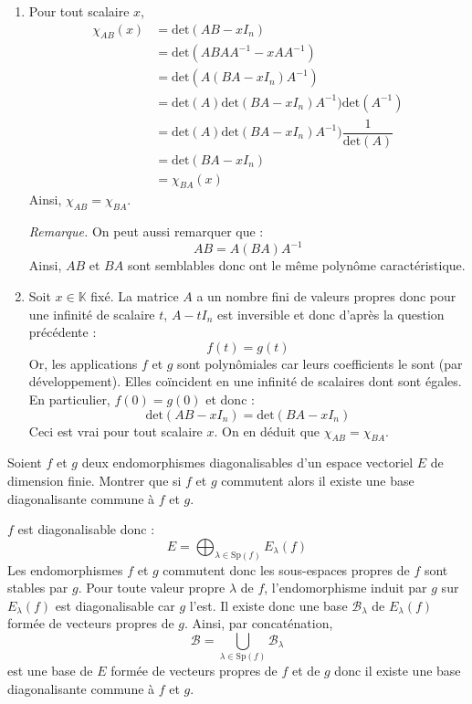 \documentclass[a4paper,10pt]{report}
\begin{document}
\begin{enumerate}
\item Pour tout scalaire $x$,
\begin{align*}
\chi_{AB}(x) & = \textrm{det}(AB-xI_n) \\
& = \textrm{det}(ABAA^{-1}-xA A^{-1}) \\
& = \textrm{det}(A(BA-xI_n) A^{-1}) \\
& = \textrm{det}(A)\textrm{det}(BA-xI_n) A^{-1})\textrm{det}(A^{-1}) \\
& = \textrm{det}(A)\textrm{det}(BA-xI_n) A^{-1}) \dfrac{1}{\textrm{det}(A)} \\
& = \textrm{det}(BA-xI_n) \\
& = \chi_{BA}(x)
\end{align*}
Ainsi, $\chi_{AB}= \chi_{BA}$.

\medskip

\noindent \textit{Remarque.} On peut aussi remarquer que :
$$ AB=  A(BA)A^{-1}$$
Ainsi, $AB$ et $BA$ sont semblables donc ont le même polynôme caractéristique.
\item Soit $x \in \mathbb{K}$ fixé. La matrice $A$ a un nombre fini de valeurs propres donc pour une infinité de scalaire $t$, $A-t I_n$ est inversible et donc d'après la question précédente :
$$ f(t)=g(t)$$
Or, les applications $f$ et $g$ sont polynômiales car leurs coefficients le sont (par développement). Elles coïncident en une infinité de scalaires dont sont égales. En particulier, $f(0)=g(0)$ et donc :
$$ \textrm{det}(AB-xI_n)= \textrm{det}(BA-xI_n)$$
Ceci est vrai pour tout scalaire $x$. On en déduit que $\chi_{AB}= \chi_{BA}$.
\end{enumerate}

\begin{Exercice}{}  Soient $f$ et $g$ deux endomorphismes diagonalisables d'un espace vectoriel $E$ de dimension finie. Montrer que si $f$ et $g$ commutent alors il existe une base diagonalisante commune à $f$ et $g$.
\end{Exercice}

\corr $f$ est diagonalisable donc :
$$ E = \bigoplus_{\lambda \in \textrm{Sp}(f)} E_{\lambda}(f)$$
Les endomorphismes $f$ et $g$ commutent donc les sous-espaces propres de $f$ sont stables par $g$. Pour toute valeur propre $\lambda$ de $f$, l'endomorphisme induit par $g$ sur $E_{\lambda}(f)$ est diagonalisable car $g$ l'est. Il existe donc une base $\mathcal{B}_{\lambda}$ de $E_{\lambda}(f)$ formée de vecteurs propres de $g$. Ainsi, par concaténation,
$$ \mathcal{B} = \bigcup_{\lambda  \in \textrm{Sp}(f)} \mathcal{B}_{\lambda}$$
est une base de $E$ formée de vecteurs propres de $f$ et de $g$ donc il existe une base diagonalisante commune à $f$ et $g$.
\end{document}
